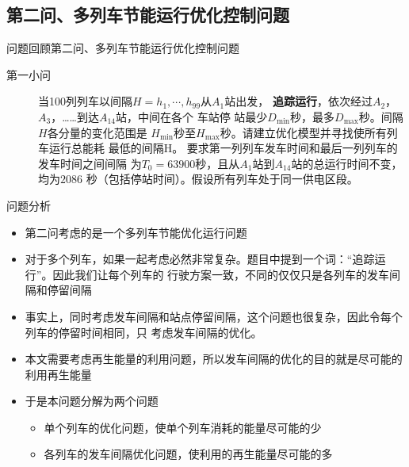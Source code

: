 \documentclass{beamer}
\newcommand\Emph{\textbf}
\begin{document}
\subsection{第二问、多列车节能运行优化控制问题}

\begin{frame}{问题回顾}{第二问、多列车节能运行优化控制问题}
\begin{description}
  \item[第一小问] 当100列列车以间隔$H={h_1,\cdots,h_{99}}$从$A_1$站出发，
      \Emph{追踪运行}，依次经过$A_2$，$A_3$，……到达$A_{14}$站，中间在各个
      车站停
      站最少$D_{\min}$秒，最多$D_{\max}$秒。间隔$H$各分量的变化范围是
      $H_{\min}$秒至$H_{\max}$秒。请建立优化模型并寻找使所有列车运行总能耗
      最低的间隔H。 要求第一列列车发车时间和最后一列列车的发车时间之间间隔
      为$T_0=63900$秒，且从$A_1$站到$A_{14}$站的总运行时间不变，均为$2086$
      秒（包括停站时间）。假设所有列车处于同一供电区段。
\end{description}
\end{frame}

\begin{frame}{问题分析}
\begin{itemize}
  \item<1-> 第二问考虑的是一个多列车节能优化运行问题
  \item<2-> 对于多个列车，如果一起考虑必然非常复杂。题目中提到一个词：“追踪运行”。因此我们让每个列车的
  行驶方案一致，不同的仅仅只是各列车的发车间隔和停留间隔
  \item<3-> 事实上，同时考虑发车间隔和站点停留间隔，这个问题也很复杂，因此令每个列车的停留时间相同，只
  考虑发车间隔的优化。
  \item<4-> 本文需要考虑再生能量的利用问题，所以发车间隔的优化的目的就是尽可能的利用再生能量
  \item<5-> 于是本问题分解为两个问题
    \begin{itemize}
        \item<6-> 单个列车的优化问题，使单个列车消耗的能量尽可能的少
        \item<7-> 各列车的发车间隔优化问题，使利用的再生能量尽可能的多
    \end{itemize}
\end{itemize}

\end{frame}
\end{document}
